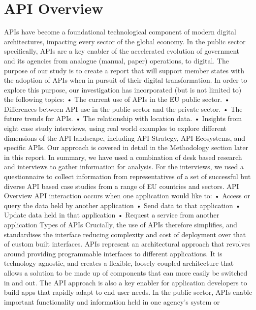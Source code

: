 \section{API Overview} %


APIs have become a foundational technological component of modern digital architectures, impacting every
sector of the global economy. In the public sector specifically, APIs are a key enabler of the accelerated
evolution of government and its agencies from analogue (manual, paper) operations, to digital.
The purpose of our study is to create a report that will support member states with the adoption of APIs
when in pursuit of their digital transformation. In order to explore this purpose, our investigation has
incorporated (but is not limited to) the following topics:
• The current use of APIs in the EU public sector.
• Differences between API use in the public sector and the private sector.
• The future trends for APIs.
• The relationship with location data.
• Insights from eight case study interviews, using real world examples to explore different
dimensions of the API landscape, including API Strategy, API Ecosystems, and specific APIs.
Our approach is covered in detail in the Methodology section later in this report. In summary, we have used
a combination of desk based research and interviews to gather information for analysis. For the interviews,
we used a questionnaire to collect information from representatives of a set of successful but diverse API
based case studies from a range of EU countries and sectors.
API Overview
API interaction occurs when one application would like to:
• Access or query the data held by another application
• Send data to that application
• Update data held in that application
• Request a service from another application
Types of APIs
Crucially, the use of APIs therefore simplifies, and standardises the interface reducing complexity and cost
of deployment over that of custom built interfaces. APIs represent an architectural approach that revolves
around providing programmable interfaces to different applications. It is technology agnostic, and creates a
flexible, loosely coupled architecture that allows a solution to be made up of components that can more
easily be switched in and out. The API approach is also a key enabler for application developers to build
apps that rapidly adapt to end user needs.
In the public sector, APIs enable important functionality and information held in one agency’s system or
